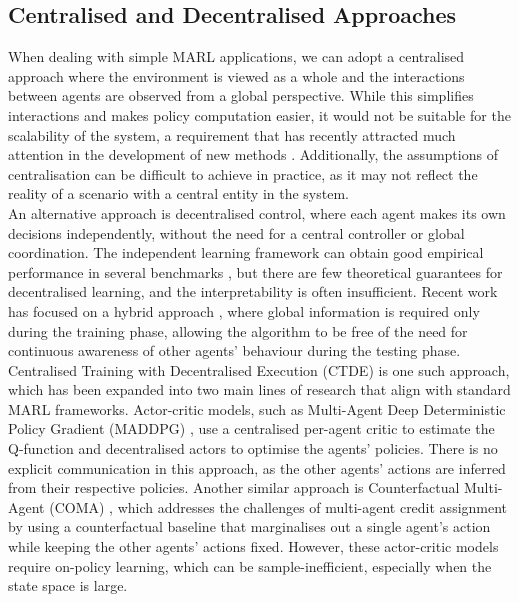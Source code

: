 \documentclass[a4paper,singleside,12pt]{report} %
\begin{document}
\subsection{Centralised and Decentralised Approaches}\label{cendecenctde}
When dealing with simple MARL applications, we can adopt a centralised approach where the environment is viewed as a whole and the interactions between agents are observed from a global perspective. While this simplifies interactions and makes policy computation easier, it would not be suitable for the scalability of the system, a requirement that has recently attracted much attention in the development of new methods \cite{Gronauer2021MultiagentDR, HernandezLeal2019ASA, Stone2022ASO}. Additionally, the assumptions of centralisation can be difficult to achieve in practice, as it may not reflect the reality of a scenario with a central entity in the system.\\
An alternative approach is decentralised control, where each agent makes its own decisions independently, without the need for a central controller or global coordination. The independent learning framework can obtain good empirical performance in several benchmarks \cite{Papoudakis2020BenchmarkingMD}, but there are few theoretical guarantees for decentralised learning, and the interpretability is often insufficient.
Recent work has focused on a hybrid approach \cite{Lowe2017MultiAgentAF, Foerster2017CounterfactualMP, AAMAS2018VDN, Rashid2018QMIXMV}, where global information is required only during the training phase, allowing the algorithm to be free of the need for continuous awareness of other agents' behaviour during the testing phase. Centralised Training with Decentralised Execution (CTDE) is one such approach, which has been expanded into two main lines of research that align with standard MARL frameworks. Actor-critic models, such as Multi-Agent Deep Deterministic Policy Gradient (MADDPG) \cite{Lowe2017MultiAgentAF}, use a centralised per-agent critic to estimate the Q-function and decentralised actors to optimise the agents' policies. There is no explicit communication in this approach, as the other agents' actions are inferred from their respective policies. Another similar approach is Counterfactual Multi-Agent (COMA) \cite{Foerster2017CounterfactualMP}, which addresses the challenges of multi-agent credit assignment by using a counterfactual baseline that marginalises out a single agent's action while keeping the other agents' actions fixed. However, these actor-critic models require on-policy learning, which can be sample-inefficient, especially when the state space is large.\\
\end{document}
